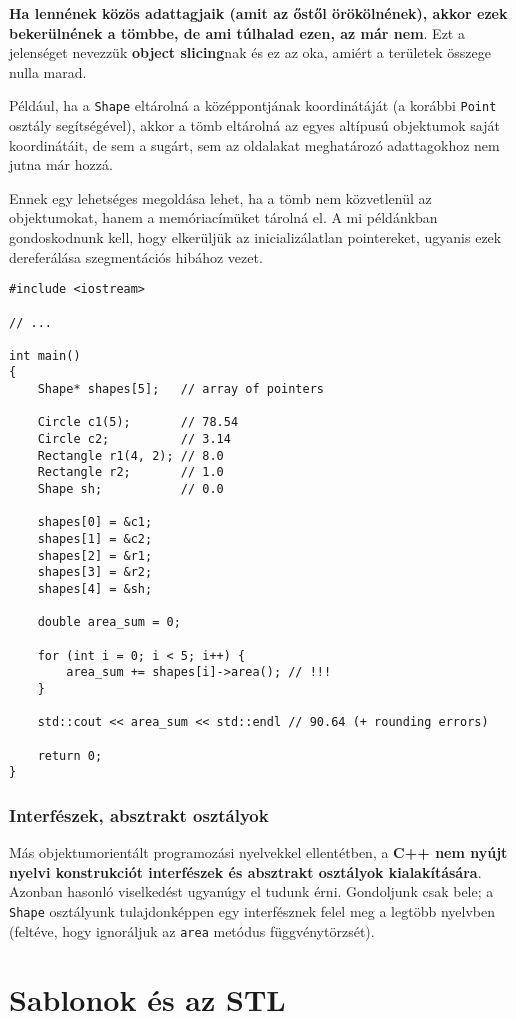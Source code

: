 \documentclass[a4paper, 11pt, oneside]{book}
\begin{document}
\textbf{Ha lennének közös adattagjaik (amit az őstől örökölnének), akkor ezek bekerülnének a tömbbe, de ami túlhalad ezen, az már nem}. Ezt a jelenséget nevezzük \textbf{object slicing}nak és ez az oka, amiért a területek összege nulla marad.

Például, ha a \verb*|Shape| eltárolná a középpontjának koordinátáját (a korábbi \verb*|Point| osztály segítségével), akkor a tömb eltárolná az egyes altípusú objektumok saját koordinátáit, de sem a sugárt, sem az oldalakat meghatározó adattagokhoz nem jutna már hozzá.

Ennek egy lehetséges megoldása lehet, ha a tömb nem közvetlenül az objektumokat, hanem a memóriacímüket tárolná el. A mi példánkban gondoskodnunk kell, hogy elkerüljük az inicializálatlan pointereket, ugyanis ezek dereferálása szegmentációs hibához vezet.


\begin{lstlisting}[style=cppstyle]
#include <iostream>

// ...

int main() 
{
	Shape* shapes[5];	// array of pointers
		
	Circle c1(5); 		// 78.54
	Circle c2;    		// 3.14
	Rectangle r1(4, 2); // 8.0
	Rectangle r2;       // 1.0
	Shape sh;			// 0.0
		
	shapes[0] = &c1;
	shapes[1] = &c2;
	shapes[2] = &r1;
	shapes[3] = &r2;
	shapes[4] = &sh;
		
	double area_sum = 0;
		
	for (int i = 0; i < 5; i++) {
		area_sum += shapes[i]->area(); // !!!
	}
		
	std::cout << area_sum << std::endl // 90.64 (+ rounding errors)
		
	return 0;
}
\end{lstlisting}

\subsection{Interfészek, absztrakt osztályok}

Más objektumorientált programozási nyelvekkel ellentétben, a \textbf{C++ nem nyújt nyelvi konstrukciót interfészek és absztrakt osztályok kialakítására}. Azonban hasonló viselkedést ugyanúgy el tudunk érni. Gondoljunk csak bele; a \verb*|Shape| osztályunk tulajdonképpen egy interfésznek felel meg a legtöbb nyelvben (feltéve, hogy ignoráljuk az \verb*|area| metódus függvénytörzsét).

\chapter{Sablonok és az STL}
\end{document}
